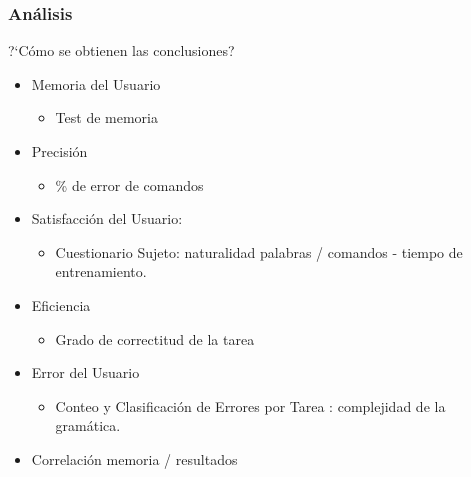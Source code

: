 \subsubsection{An\'alisis}
{?`}C\'omo se obtienen las conclusiones?
\begin{itemize}
    \item Memoria del Usuario
    \begin{itemize}
        \item Test de memoria
    \end{itemize}
    \item Precisi\'on
    \begin{itemize}
        \item \% de error de comandos
    \end{itemize}
    \item Satisfacci\'on del Usuario:
    \begin{itemize}
        \item Cuestionario Sujeto: naturalidad palabras / comandos - tiempo de entrenamiento.   
    \end{itemize}
    \item Eficiencia
    \begin{itemize}
        \item Grado de correctitud de la tarea
    \end{itemize}
    \item Error del Usuario
    \begin{itemize}
        \item Conteo y Clasificaci\'on de Errores por Tarea : complejidad de la gram\'atica.
    \end{itemize}
    \item Correlaci\'on memoria / resultados
\end{itemize}
